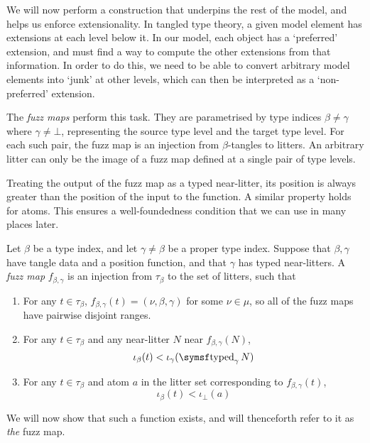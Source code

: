 We will now perform a construction that underpins the rest of the model, and helps us enforce extensionality.
In tangled type theory, a given model element has extensions at each level below it.
In our model, each object has a `preferred' extension, and must find a way to compute the other extensions from that information.
In order to do this, we need to be able to convert arbitrary model elements into `junk' at other levels, which can then be interpreted as a `non-preferred' extension.

The \emph{fuzz maps} perform this task.
They are parametrised by type indices \( \beta \neq \gamma \) where \( \gamma \neq \bot \), representing the source type level and the target type level.
For each such pair, the fuzz map is an injection from \( \beta \)-tangles to litters.
An arbitrary litter can only be the image of a fuzz map defined at a single pair of type levels.

Treating the output of the fuzz map as a typed near-litter, its position is always greater than the position of the input to the function.
A similar property holds for atoms.
This ensures a well-foundedness condition that we can use in many places later.

\begin{definition}
    \label{def:fuzz}
    Let \( \beta \) be a type index, and let \( \gamma \neq \beta \) be a proper type index.
    Suppose that \( \beta, \gamma \) have tangle data and a position function, and that \( \gamma \) has typed near-litters.
    A \emph{fuzz map} \( f_{\beta,\gamma} \) is an injection from \( \tau_\beta \) to the set of litters, such that
    \begin{enumerate}
        \item For any \( t \in \tau_\beta \), \( f_{\beta,\gamma}(t) = (\nu, \beta, \gamma) \) for some \( \nu \in \mu \), so all of the fuzz maps have pairwise disjoint ranges.
        \item For any \( t \in \tau_\beta \) and any near-litter \( N \) near \( f_{\beta,\gamma}(N) \),
        \[ \iota_\beta(t) < \iota_\gamma(\typed_\gamma N) \]
        \item For any \( t \in \tau_\beta \) and atom \( a \) in the litter set corresponding to \( f_{\beta,\gamma}(t) \),
        \[ \iota_\beta(t) < \iota_\bot(a) \]
    \end{enumerate}
\end{definition}

We will now show that such a function exists, and will thenceforth refer to it as \emph{the} fuzz map.

